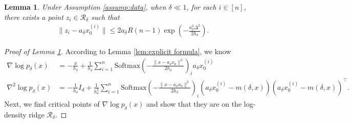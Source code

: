 \documentclass[11pt]{article}
\newcommand{\mc}{\mathcal}
\newcommand{\Softmax}{\mathrm{Softmax}}
\newtheorem{lemma}{Lemma}[section]
\begin{document}
\begin{lemma}\label{lem:existence of ridge points} Under Assumption \ref{assump:data}, when $\delta\ll 1$, for each $i\in [n]$, there exists a point $z_i\in \mc{R}_\delta$ such that
    \begin{align*}
        \| z_i - a_\delta x_0^{(i)} \| \le 2a_\delta R (n-1)\exp(-\frac{a_\delta^2\Delta^2}{2h_\delta}).
    \end{align*}
\end{lemma}
\begin{proof}[Proof of Lemma \ref{lem:existence of ridge points}]
    According to Lemma \ref{lem:explicit formula}, we know 
\begin{align*}
    \nabla\log p_\delta (x) &= -\frac{x}{h_\delta} + \frac{1}{h_\delta}\sum_{i=1}^n \Softmax(-\frac{\|x-a_\delta x_0\|^2}{2h_\delta})_i a_\delta x_0^{(i)} \\
    \nabla^2 \log p_\delta(x) & = -\frac{1}{h_\delta} I_d + \frac{1}{h_\delta^2}\sum_{i=1}^n \Softmax(-\frac{\|x-a_\delta x_0\|^2}{2h_\delta})_i (a_\delta x_0^{(i)}-m(\delta,x))(a_\delta x_0^{(i)}-m(\delta,x))^\intercal.
\end{align*}
Next, we find critical points of $\nabla\log p_\delta(x)$ and show that they are on the log-density ridge $\mc{R}_\delta$. 


\end{proof}
\end{document}

